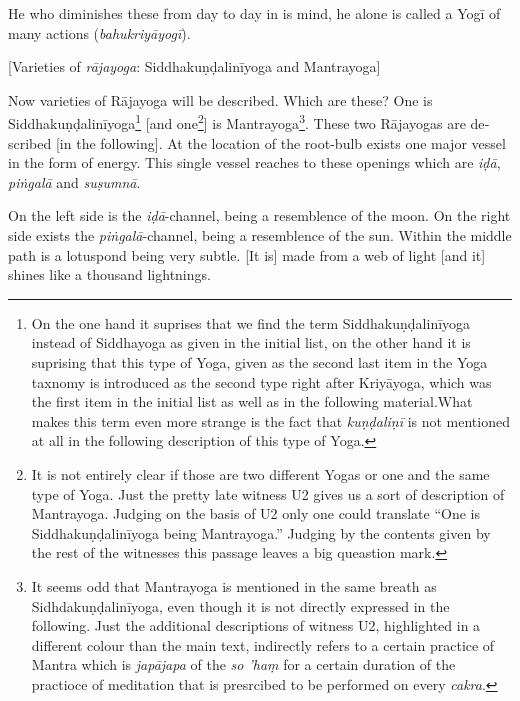 \begin{otherlanguage}{english}
\begin{tlate}
     He who diminishes these from day to day in is mind, he alone is called a Yogī of many actions (\textit{bahukriyāyogī}).
   \end{tlate}
        \bigskip
    \centerline{\textrm{\small{[Varieties of \textit{rājayoga}: Siddhakuṇḍalinīyoga and Mantrayoga]}}}
    \bigskip
    \begin{tlate}
      Now varieties of Rājayoga will be described. Which are these? One is Siddhakuṇḍalinīyoga\footnote{On the one hand it suprises that we find the term Siddhakuṇḍalinīyoga instead of Siddhayoga as given in the initial list, on the other hand it is suprising that this type of Yoga, given as the second last item in the Yoga taxnomy is introduced as the second type right after Kriyāyoga, which was the first item in the initial list as well as in the following material.What makes this term even more strange is the fact that \textit{kuṇḍaliṇī} is not mentioned at all in the following description of this type of Yoga.} [and one\footnote{It is not entirely clear if those are two different Yogas or one and the same type of Yoga. Just the pretty late witness U2 gives us a sort of description of Mantrayoga. Judging on the basis of U2 only one could translate ``One is Siddhakuṇḍalinīyoga being Mantrayoga.'' Judging by the contents given by the rest of the witnesses this passage leaves a big queastion mark.}] is Mantrayoga\footnote{It seems odd that Mantrayoga is mentioned in the same breath as Sidhdakuṇḍalinīyoga, even though it is not directly expressed in the following. Just the additional descriptions of witness U2, highlighted in a different colour than the main text, indirectly refers to a certain practice of Mantra which is \textit{japājapa} of the \textit{so 'haṃ} for a certain duration of the practioce of meditation that is presrcibed to be performed on every \textit{cakra}.}. These two Rājayogas are described [in the following]. At the location of the root-bulb exists one major vessel in the form of energy. This single vessel reaches to these openings which are \textit{iḍā}, \textit{piṅgalā} and \textit{suṣumnā}.
    \end{tlate}
      \begin{tlate}
        On the left side is the \textit{iḍā}-channel, being a resemblence of the moon. On the right side exists the \textit{piṅgalā}-channel, being a resemblence of the sun. Within the middle path is a lotuspond being very subtle. [It is] made from a web of light [and it] shines like a thousand lightnings.

\end{tlate}
\end{otherlanguage}
